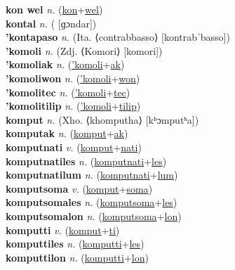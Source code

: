 \textbf{kon wel} \textit{n.} (\hyperref[kon]{kon}+\hyperref[wel]{wel})
 \label{kon wel} \\
\textbf{kontal} \textit{n.} ( [ɡɔndar])
 \label{kontal} \\
\textbf{'kontapaso} \textit{n.} (Ita. ⟨contrabbasso⟩ [kontrabˈbasso])
 \label{'kontapaso} \\
\textbf{'komoli} \textit{n.} (Zdj. ⟨Komori⟩ [komori])
 \label{'komoli} \\
\textbf{'komoliak} \textit{n.} (\hyperref['komoli]{'komoli}+\hyperref[ak]{ak})
 \label{'komoliak} \\
\textbf{'komoliwon} \textit{n.} (\hyperref['komoli]{'komoli}+\hyperref[won]{won})
 \label{'komoliwon} \\
\textbf{'komolitec} \textit{n.} (\hyperref['komoli]{'komoli}+\hyperref[tec]{tec})
 \label{'komolitec} \\
\textbf{'komolitilip} \textit{n.} (\hyperref['komoli]{'komoli}+\hyperref[tilip]{tilip})
 \label{'komolitilip} \\
\textbf{komput} \textit{n.} (Xho. ⟨khomputha⟩ [kʰɔmputʰa])
 \label{komput} \\
\textbf{komputak} \textit{n.} (\hyperref[komput]{komput}+\hyperref[ak]{ak})
 \label{komputak} \\
\textbf{komputnati} \textit{v.} (\hyperref[komput]{komput}+\hyperref[nati]{nati})
 \label{komputnati} \\
\textbf{komputnatiles} \textit{n.} (\hyperref[komputnati]{komputnati}+\hyperref[les]{les})
 \label{komputnatiles} \\
\textbf{komputnatilum} \textit{n.} (\hyperref[komputnati]{komputnati}+\hyperref[lum]{lum})
 \label{komputnatilum} \\
\textbf{komputsoma} \textit{v.} (\hyperref[komput]{komput}+\hyperref[soma]{soma})
 \label{komputsoma} \\
\textbf{komputsomales} \textit{n.} (\hyperref[komputsoma]{komputsoma}+\hyperref[les]{les})
 \label{komputsomales} \\
\textbf{komputsomalon} \textit{n.} (\hyperref[komputsoma]{komputsoma}+\hyperref[lon]{lon})
 \label{komputsomalon} \\
\textbf{komputti} \textit{v.} (\hyperref[komput]{komput}+\hyperref[ti]{ti})
 \label{komputti} \\
\textbf{komputtiles} \textit{n.} (\hyperref[komputti]{komputti}+\hyperref[les]{les})
 \label{komputtiles} \\
\textbf{komputtilon} \textit{n.} (\hyperref[komputti]{komputti}+\hyperref[lon]{lon})

